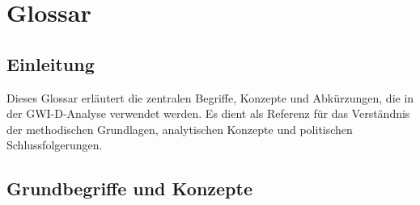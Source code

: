 \chapter{Glossar}
\label{chap:anhang_e}

\section*{Einleitung}
Dieses Glossar erläutert die zentralen Begriffe, Konzepte und Abkürzungen, die in der GWI-D-Analyse verwendet werden. Es dient als Referenz für das Verständnis der methodischen Grundlagen, analytischen Konzepte und politischen Schlussfolgerungen.

\section{Grundbegriffe und Konzepte}

